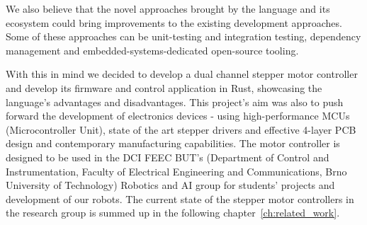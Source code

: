 We also believe that the novel approaches brought by the language and its ecosystem could bring improvements to the existing development approaches.
Some of these approaches can be unit-testing and integration testing, dependency management and embedded-systems-dedicated open-source tooling.

With this in mind we decided to develop a dual channel stepper motor controller and develop its firmware and control application in Rust, showcasing the language's advantages and disadvantages.
This project's aim was also to push forward the development of electronics devices - using high-performance MCUs (Microcontroller Unit), state of the art stepper drivers and effective 4-layer PCB design and contemporary manufacturing capabilities.
The motor controller is designed to be used in the DCI FEEC BUT's (Department of Control and Instrumentation, Faculty of Electrical Engineering and Communications, Brno University of Technology) Robotics and AI group for students' projects and development of our robots.
The current state of the stepper motor controllers in the research group is summed up in the following chapter~\ref{ch:related_work}.

